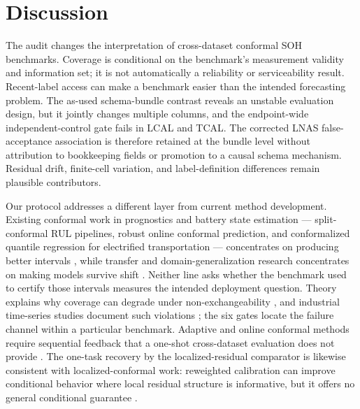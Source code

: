 \documentclass[
  number,
  preprint]{elsarticle}
\begin{document}
\section{Discussion}\label{sec-discussion}

The audit changes the interpretation of cross-dataset conformal SOH
benchmarks. Coverage is conditional on the benchmark's measurement
validity and information set; it is not automatically a reliability or
serviceability result. Recent-label access can make a benchmark easier
than the intended forecasting problem. The as-used schema-bundle
contrast reveals an unstable evaluation design, but it jointly changes
multiple columns, and the endpoint-wide independent-control gate fails
in LCAL and TCAL. The corrected LNAS false-acceptance association is
therefore retained at the bundle level without attribution to
bookkeeping fields or promotion to a causal schema mechanism. Residual
drift, finite-cell variation, and label-definition differences remain
plausible contributors.

Our protocol addresses a different layer from current method
development. Existing conformal work in prognostics and battery state
estimation --- split-conformal RUL pipelines, robust online conformal
prediction, and conformalized quantile regression for electrified
transportation --- concentrates on producing better intervals
\citep{xu2026uncertaintyaware, wang2025robust, javanmardi2023conformal, piao2025crulp, soon2026enhancing},
while transfer and domain-generalization research concentrates on making
models survive shift
\citep{nejjar2026uncertaintyguided, fei2026decoupled}. Neither line asks
whether the benchmark used to certify those intervals measures the
intended deployment question. Theory explains why coverage can degrade
under non-exchangeability \citep{barber2023beyond, oliveira2024split},
and industrial time-series studies document such violations
\citep{zhang2025uncertainty}; the six gates locate the failure channel
within a particular benchmark. Adaptive and online conformal methods
require sequential feedback that a one-shot cross-dataset evaluation
does not provide \citep{gibbs2021adaptive, gibbs2024conformal}. The
one-task recovery by the localized-residual comparator is likewise
consistent with localized-conformal work: reweighted calibration can
improve conditional behavior where local residual structure is
informative, but it offers no general conditional guarantee
\citep{guan2022localized, hore2024conformal}.
\end{document}

